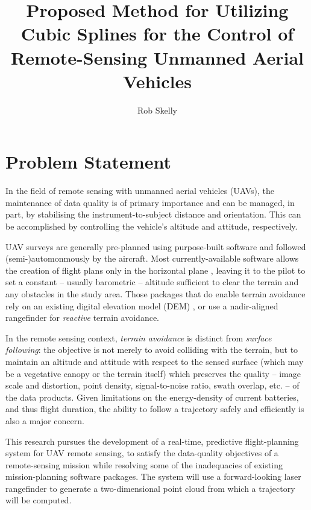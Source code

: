 \documentclass[doc]{apa6}
\title{Proposed Method for Utilizing Cubic Splines for the Control of Remote-Sensing Unmanned Aerial Vehicles}
\author{Rob Skelly}
\affiliation{University of Victoria}
\begin{document}
\maketitle

\section{Problem Statement}

In the field of remote sensing with unmanned aerial vehicles (UAVs), the maintenance of data quality is of primary importance and can be managed, in part, by stabilising the instrument-to-subject distance and orientation. This can be accomplished by controlling the vehicle's altitude and attitude, respectively.

UAV surveys are generally pre-planned using purpose-built software and followed (semi-)automonmously by the aircraft. Most currently-available software allows the creation of flight plans only in the horizontal plane \parencite[e.g.,][]{ArduPilot2018,DJI2018a,Microdrones2018,Group2018,UAVToolbox2018}, leaving it to the pilot to set a constant -- usually barometric -- altitude sufficient to clear the terrain and any obstacles in the study area. Those packages that do enable terrain avoidance rely on an  existing digital elevation model (DEM) \parencite[e.g.,][]{PrecisionHawk2018,UgCS2018,MapsMadeEasy2018}, or use a nadir-aligned rangefinder for \emph{reactive} terrain avoidance.

In the remote sensing context, \emph{terrain avoidance} is distinct from \emph{surface following}: the objective is not merely to avoid colliding with the terrain, but to maintain an altitude and attitude with respect to the sensed surface (which may be a vegetative canopy or the terrain itself) which preserves the quality -- image scale and distortion, point density, signal-to-noise ratio, swath overlap, etc. -- of the data products. Given limitations on the energy-density of current batteries, and thus flight duration, the ability to follow a trajectory safely and efficiently is also a major concern.

This research pursues the development of a real-time, predictive flight-planning system for UAV remote sensing, to satisfy the data-quality objectives of a remote-sensing mission while resolving some of the inadequacies of existing mission-planning software packages. The system will use a forward-looking laser rangefinder to generate a two-dimensional point cloud from which a trajectory will be computed.
\end{document}
